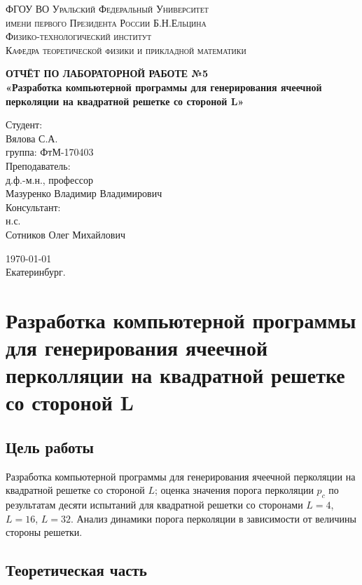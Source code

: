 \documentclass[14pt,a4paper,report]{ncc}
\begin{document}
\def\contentsname{Содержание}

\begin{titlepage}
\begin{center}
\textsc{ФГОУ ВО Уральский Федеральный Университет \\ имени первого Президента России Б.Н.Ельцина\\[5mm]
Физико-технологический институт\\[2mm]
Кафедра теоретической физики и прикладной математики}

\vfill

\textbf{ОТЧЁТ ПО ЛАБОРАТОРНОЙ РАБОТЕ №5\\[3mm]
«Разработка компьютерной программы для генерирования ячеечной перколяции на квадратной решетке со стороной L»\\[6mm]
}
\end{center}

\hfill
\begin{minipage}{.5\textwidth}
Студент:\\[2mm] 
Вялова С.А.\\
группа: ФтМ-170403 \\[5mm]

Преподаватель:\\[2mm] 
д.ф.-м.н., профессор\\
Мазуренко Владимир Владимирович\\[5mm]

Консультант:\\[2mm] 
н.с.\\
Сотников Олег Михайлович\\

\end{minipage}%
\vfill
\begin{center}
\today  \\
 Екатеринбург.
\end{center}
\end{titlepage}

\tableofcontents
\newpage
\chapter{Разработка компьютерной программы для генерирования ячеечной перколляции на квадратной решетке со стороной L}
\section{Цель работы}
Разработка компьютерной программы для генерирования ячеечной перколяции на квадратной решетке со стороной $L$; оценка значения порога перколяции $p_c$ по результатам десяти испытаний для квадратной решетки со сторонами $L=4$, $L=16$, $L=32$. Анализ динамики порога перколяции в зависимости от величины стороны решетки.
\newpage\section{Теоретическая часть}
\end{document}
